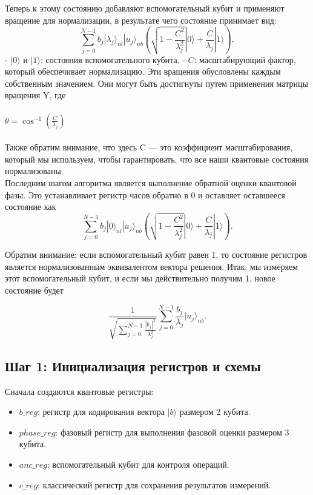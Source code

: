 Теперь к этому состоянию добавляют вспомогательный кубит и применяют вращение для нормализации, в результате чего состояние принимает вид:
\[
\sum_{j=0}^{N-1} b_j |\lambda_j\rangle_{nl} |u_j\rangle_{nb} \left( \sqrt{1 - \frac{C^2}{\lambda_j^2}} |0\rangle + \frac{C}{\lambda_j} |1\rangle \right),
\]
- \( |0\rangle \) и \( |1\rangle \): состояния вспомогательного кубита.
- \( C \): масштабирующий фактор, который обеспечивает нормализацию.
Эти вращения обусловлены каждым собственным значением. Они могут быть достигнуты путем применения матрицы вращения Y, где \\ \\ \( \theta = \cos^{-1} \left( \frac{C}{\lambda_j} \right) \)\\ \\
Также обратим внимание, что здесь C — это коэффициент масштабирования, который мы используем, чтобы гарантировать, что все наши квантовые состояния нормализованы. \\
Последним шагом алгоритма является выполнение обратной оценки квантовой фазы. Это устанавливает регистр часов обратно в 0 и оставляет оставшееся состояние как
\[
\sum_{j=0}^{N-1} b_j |0\rangle_{nl} |u_j\rangle_{nb} \left( \sqrt{1 - \frac{C^2}{\lambda_j^2}} |0\rangle + \frac{C}{\lambda_j} |1\rangle \right).
\]

Обратим внимание: если вспомогательный кубит равен 1, то состояние регистров является нормализованным эквивалентом вектора решения. Итак, мы измеряем этот вспомогательный кубит, и если мы действительно получим 1, новое состояние будет

\[
\frac{1}{\sqrt{\sum_{j=0}^{N-1} \frac{|b_j|^2}{\lambda_j^2}}} \sum_{j=0}^{N-1} \frac{b_j}{\lambda_j} |u_j\rangle_{nb}.
\]

\textbf{}




\subsection*{Шаг 1: Инициализация регистров и схемы}

Сначала создаются квантовые регистры:
\begin{itemize}
    \item \( b\_reg \): регистр для кодирования вектора \( |b\rangle \) размером 2 кубита.
    \item \( phase\_reg \): фазовый регистр для выполнения фазовой оценки размером 3 кубита.
    \item \( anc\_reg \): вспомогательный кубит для контроля операций.
    \item \( c\_reg \): классический регистр для сохранения результатов измерений.
\end{itemize}

